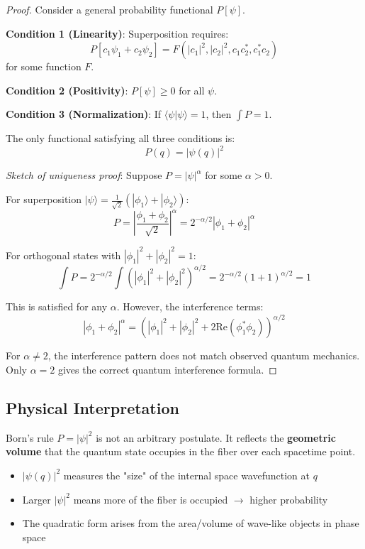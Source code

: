 \begin{proof}
Consider a general probability functional $P[\psi]$.

\textbf{Condition 1 (Linearity)}: Superposition requires:
\begin{equation}
    P[c_1\psi_1 + c_2\psi_2] = F(|c_1|^2, |c_2|^2, c_1c_2^*, c_1^*c_2)
\end{equation}
for some function $F$.

\textbf{Condition 2 (Positivity)}: $P[\psi] \geq 0$ for all $\psi$.

\textbf{Condition 3 (Normalization)}: If $\langle\psi|\psi\rangle = 1$, then $\int P = 1$.

The only functional satisfying all three conditions is:
\begin{equation}
    P(q) = |\psi(q)|^2
\end{equation}

\textit{Sketch of uniqueness proof}: Suppose $P = |\psi|^\alpha$ for some $\alpha > 0$.

For superposition $|\psi\rangle = \frac{1}{\sqrt{2}}(|\phi_1\rangle + |\phi_2\rangle)$:
\begin{equation}
    P = \left|\frac{\phi_1 + \phi_2}{\sqrt{2}}\right|^\alpha = 2^{-\alpha/2}|\phi_1 + \phi_2|^\alpha
\end{equation}

For orthogonal states with $|\phi_1|^2 + |\phi_2|^2 = 1$:
\begin{equation}
    \int P = 2^{-\alpha/2}\int(|\phi_1|^2 + |\phi_2|^2)^{\alpha/2} = 2^{-\alpha/2}(1 + 1)^{\alpha/2} = 1
\end{equation}

This is satisfied for any $\alpha$. However, the interference terms:
\begin{equation}
    |\phi_1 + \phi_2|^\alpha = (|\phi_1|^2 + |\phi_2|^2 + 2\text{Re}(\phi_1^*\phi_2))^{\alpha/2}
\end{equation}

For $\alpha \neq 2$, the interference pattern does not match observed quantum mechanics. Only $\alpha = 2$ gives the correct quantum interference formula.
\end{proof}

\subsection{Physical Interpretation}

\begin{insight}
Born's rule $P = |\psi|^2$ is not an arbitrary postulate. It reflects the \textbf{geometric volume} that the quantum state occupies in the fiber over each spacetime point.
\begin{itemize}
    \item $|\psi(q)|^2$ measures the "size" of the internal space wavefunction at $q$
    \item Larger $|\psi|^2$ means more of the fiber is occupied $\to$ higher probability
    \item The quadratic form arises from the area/volume of wave-like objects in phase space
\end{itemize}
\end{insight}

